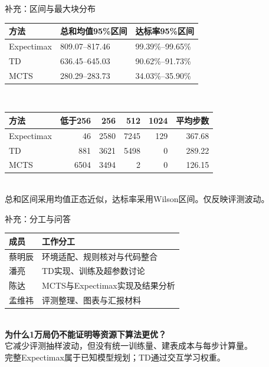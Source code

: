 \documentclass[11pt]{beamer}
\newcommand{\smalltext}{\fontsize{9pt}{12pt}\selectfont}
\begin{document}
\begin{frame}{补充：区间与最大块分布}
\scriptsize\begin{tabularx}{\linewidth}{@{}lXX@{}}\toprule 方法&总和均值95\%区间&达标率95\%区间\\\midrule
Expectimax&809.07--817.46&99.39\%--99.65\%\\[1mm]
TD&636.45--645.03&90.62\%--91.73\%\\[1mm]
MCTS&280.29--283.73&34.03\%--35.90\%\\[1mm]
\bottomrule\end{tabularx}\\[4mm]
\begin{tabularx}{\linewidth}{@{}Xrrrrr@{}}\toprule 方法&低于256&256&512&1024&平均步数\\\midrule
Expectimax&46&2580&7245&129&367.68\\[1mm]
TD&881&3621&5498&0&289.22\\[1mm]
MCTS&6504&3494&2&0&126.15\\[1mm]
\bottomrule\end{tabularx}\\[3mm]
\smalltext 总和区间采用均值正态近似，达标率采用Wilson区间。仅反映评测波动。
\end{frame}
\begin{frame}{补充：分工与问答}
\smalltext\begin{tabularx}{\linewidth}{@{}lX@{}}\toprule 成员&工作分工\\\midrule
蔡明辰&环境适配、规则核对与代码整合\\[2mm]
潘亮&TD实现、训练及超参数讨论\\[2mm]
陈达&MCTS与Expectimax实现及结果分析\\[2mm]
孟维祎&评测整理、图表与汇报材料\\\bottomrule\end{tabularx}\\[4mm]
\textbf{为什么1万局仍不能证明等资源下算法更优？}\\[2mm]
它减少评测抽样波动，但没有统一训练量、建表成本与每步计算量。\\[2mm]
完整Expectimax属于已知模型规划；TD通过交互学习权重。
\end{frame}
\end{document}
